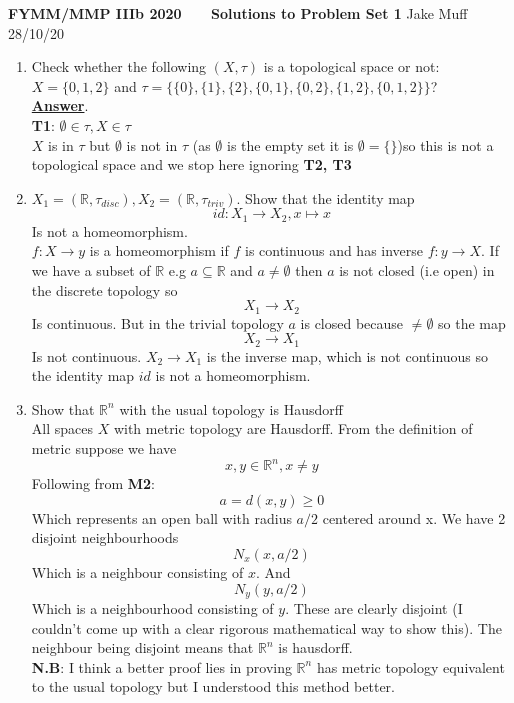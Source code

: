 \documentclass[12pt]{article}
\begin{document}
\normalsize

\baselineskip 14pt

\begin{center}
{\Large {\bf FYMM/MMP IIIb 2020 \ \ \ Solutions to Problem Set 1}}
Jake Muff
28/10/20
\end{center}


\begin{enumerate}

\item Check whether the following $(X,\tau)$  is a topological space or not:
 $X=\{0,1,2\}$ and $\tau=\{\{0\},\{1\},\{2\},\{0,1\},\{0,2\},\{1,2\},\{0,1,2\} \}$? \\
\textbf{\underline{Answer}}. \\
 \textbf{T1}: $\emptyset \in \tau, X \in \tau$
 \\
 $X$ is in $\tau$ but $\emptyset$ is not in $\tau$ (as $\emptyset$ is the empty set it is $\emptyset = \{\}$)so this is not a topological space and we stop here ignoring \textbf{T2, T3}

\item $X_1 = (\mathbb{R}, \tau_{disc}), X_2 = (\mathbb{R}, \tau_{triv})$. Show that the identity map 
$$ id: X_1 \rightarrow X_2, x \mapsto x$$
Is not a homeomorphism. 
\\
$f: X \rightarrow y$ is a homeomorphism if $f$ is continuous and has inverse $f:y \rightarrow X$. If we have a subset of $\mathbb{R}$ e.g $a \subseteq \mathbb{R}$ and $a \neq \emptyset$ then $a$ is not closed (i.e open) in the discrete topology so 
$$ X_1 \rightarrow X_2 $$
Is continuous. But in the trivial topology $a$ is closed because $\neq \emptyset$ so the map 
$$ X_2 \rightarrow X_1$$ 
Is not continuous. $X_2 \rightarrow X_1$ is the inverse map, which is not continuous so the identity map $id$ is not a homeomorphism. 


\item Show that $\mathbb{R}^n$ with the usual topology is Hausdorff
\\
All spaces $X$ with metric topology are Hausdorff. From the definition of metric suppose we have 
$$ x,y \in \mathbb{R}^n, x \neq y $$ 
Following from \textbf{M2}:
$$ a = d(x,y) \geq 0 $$
Which represents an open ball with radius $a/2$ centered around x. We have 2 disjoint neighbourhoods
$$ N_x(x,a/2) $$
Which is a neighbour consisting of $x$. And 
$$ N_y (y, a/2) $$ 
Which is a neighbourhood consisting of $y$. These are clearly disjoint (I couldn't come up with a clear rigorous mathematical way to show this). The neighbour being disjoint means that $\mathbb{R}^n$ is hausdorff. 
\\
\textbf{N.B}: I think a better proof lies in proving $\mathbb{R}^n$ has metric topology equivalent to the usual topology but I understood this method better. 



\end{enumerate}
\end{document}
